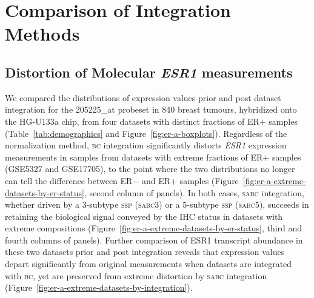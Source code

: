 \documentclass{article}\usepackage[]{graphicx}\usepackage[]{color}
\begin{document}
\section{Comparison of Integration Methods}
\label{sec:evaluation}

\subsection{Distortion of Molecular \emph{ESR1} measurements}
\label{sec:distortion-ESR1}
We compared the distributions of expression values prior and post dataset
integration for the \textsf{205225\_at} probeset in 840 breast tumours,
hybridized onto the HG-U133a chip, from four datasets with distinct fractions of
ER$+$ samples (Table~\ref{tab:demographics} and Figure~\ref{fig:er-a-boxplots}).
Regardless of the normalization method, \textsc{bc} integration significantly
distorts \emph{ESR1} expression measurements in samples from datasets with
extreme fractions of ER$+$ samples (GSE5327 and GSE17705), to the point where
the two distributions no longer can tell the difference between ER$-$ and ER$+$
samples (Figure~\ref{fig:er-a-extreme-datasets-by-er-status}, second column of
panels).  In both cases, \textsc{sabc} integration, whether driven by a
3-subtype \textsc{ssp} (\textsc{sabc3}) or a 5-subtype \textsc{ssp}
(\textsc{sabc5}), succeeds in retaining the biological signal conveyed by the
IHC status in datasets with extreme compositions
(Figure~\ref{fig:er-a-extreme-datasets-by-er-status}, third and fourth columns
of panels).  Further comparison of ESR1 transcript abundance in these two
datasets prior and post integration reveals that expression values depart
significantly from original measurements when datasets are integrated with
\textsc{bc}, yet are preserved from extreme distortion by \textsc{sabc}
integration (Figure~\ref{fig:er-a-extreme-datasets-by-integration}).
\end{document}
